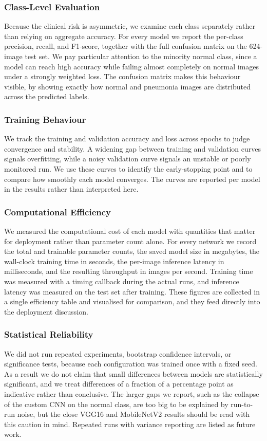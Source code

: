 \documentclass[preprint,12pt]{elsarticle}
\begin{document}
\subsubsection{Class-Level Evaluation}
Because the clinical risk is asymmetric, we examine each class separately rather than relying on aggregate accuracy.
For every model we report the per-class precision, recall, and F1-score, together with the full confusion matrix on the 624-image test set.
We pay particular attention to the minority normal class, since a model can reach high accuracy while failing almost completely on normal images under a strongly weighted loss.
The confusion matrix makes this behaviour visible, by showing exactly how normal and pneumonia images are distributed across the predicted labels.

\subsubsection{Training Behaviour}
We track the training and validation accuracy and loss across epochs to judge convergence and stability.
A widening gap between training and validation curves signals overfitting, while a noisy validation curve signals an unstable or poorly monitored run.
We use these curves to identify the early-stopping point and to compare how smoothly each model converges.
The curves are reported per model in the results rather than interpreted here.

\subsubsection{Computational Efficiency}
We measured the computational cost of each model with quantities that matter for deployment rather than parameter count alone.
For every network we record the total and trainable parameter counts, the saved model size in megabytes, the wall-clock training time in seconds, the per-image inference latency in milliseconds, and the resulting throughput in images per second.
Training time was measured with a timing callback during the actual runs, and inference latency was measured on the test set after training.
These figures are collected in a single efficiency table and visualised for comparison, and they feed directly into the deployment discussion.

\subsubsection{Statistical Reliability}
We did not run repeated experiments, bootstrap confidence intervals, or significance tests, because each configuration was trained once with a fixed seed.
As a result we do not claim that small differences between models are statistically significant, and we treat differences of a fraction of a percentage point as indicative rather than conclusive.
The larger gaps we report, such as the collapse of the custom CNN on the normal class, are too big to be explained by run-to-run noise, but the close VGG16 and MobileNetV2 results should be read with this caution in mind.
Repeated runs with variance reporting are listed as future work.
\end{document}
